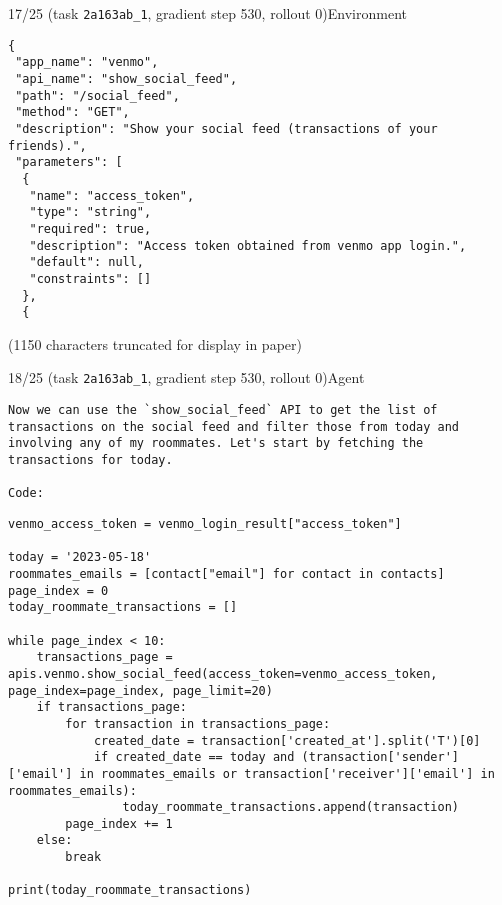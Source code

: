 \hspace*{8mm}%
\begin{minipage}{0.95\linewidth}
\begin{user_message_box}{{17/25 (task \texttt{2a163ab\_1}, gradient step 530, rollout 0)\hfill Environment}}
\scriptsize
\begin{Verbatim}[breaklines]
{
 "app_name": "venmo",
 "api_name": "show_social_feed",
 "path": "/social_feed",
 "method": "GET",
 "description": "Show your social feed (transactions of your friends).",
 "parameters": [
  {
   "name": "access_token",
   "type": "string",
   "required": true,
   "description": "Access token obtained from venmo app login.",
   "default": null,
   "constraints": []
  },
  {
\end{Verbatim}
(1150 characters truncated for display in paper)\end{user_message_box}
\end{minipage}

\begin{minipage}{0.95\linewidth}
\begin{assistant_message_box}{{18/25 (task \texttt{2a163ab\_1}, gradient step 530, rollout 0)\hfill Agent}}
\scriptsize
\begin{Verbatim}[breaklines]
Now we can use the `show_social_feed` API to get the list of transactions on the social feed and filter those from today and involving any of my roommates. Let's start by fetching the transactions for today.

Code:
\end{Verbatim}
\begin{tcolorbox}[colback=codebgcolor,boxrule=0pt]\begin{Verbatim}[breaklines]
venmo_access_token = venmo_login_result["access_token"]

today = '2023-05-18'
roommates_emails = [contact["email"] for contact in contacts]
page_index = 0
today_roommate_transactions = []

while page_index < 10:
    transactions_page = apis.venmo.show_social_feed(access_token=venmo_access_token, page_index=page_index, page_limit=20)
    if transactions_page:
        for transaction in transactions_page:
            created_date = transaction['created_at'].split('T')[0]
            if created_date == today and (transaction['sender']['email'] in roommates_emails or transaction['receiver']['email'] in roommates_emails):
                today_roommate_transactions.append(transaction)
        page_index += 1
    else:
        break

print(today_roommate_transactions)
\end{Verbatim}
\end{tcolorbox}\end{assistant_message_box}
\end{minipage}

